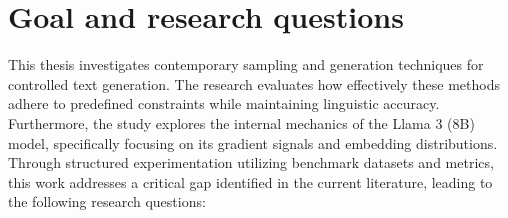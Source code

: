 \documentclass[11pt]{article}
\begin{document}


\section{Goal and research questions}

This thesis investigates contemporary sampling and generation techniques for controlled text generation. The research evaluates how effectively these methods adhere to predefined constraints while maintaining linguistic accuracy. Furthermore, the study explores the internal mechanics of the Llama 3 (8B) model, specifically focusing on its gradient signals and embedding distributions. Through structured experimentation utilizing benchmark datasets and metrics, this work addresses a critical gap identified in the current literature, leading to the following research questions: 

\end{document}
